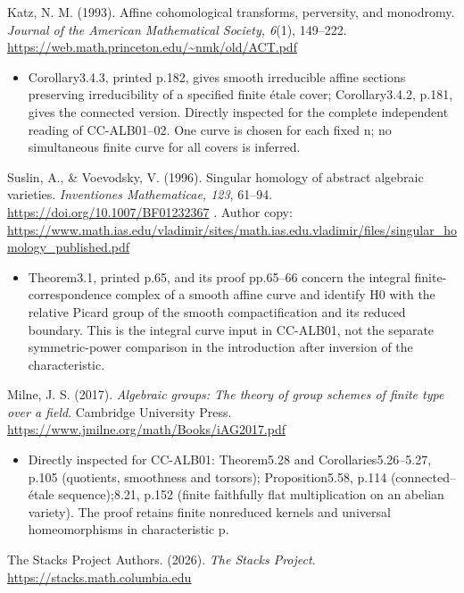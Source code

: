 \documentclass[11pt,a4paper]{article}
\providecommand{\tightlist}{\setlength{\itemsep}{0pt}\setlength{\parskip}{0pt}}
\theoremstyle{definition}\newtheorem{definition}[theorem]{Definition}
\theoremstyle{remark}\newtheorem{remark}[theorem]{Remark}
\begin{document}
Katz, N. M. (1993). Affine cohomological transforms, perversity, and
monodromy. \emph{Journal of the American Mathematical Society, 6}(1),
149--222. \url{https://web.math.princeton.edu/~nmk/old/ACT.pdf}

\begin{itemize}
\tightlist
\item
  Corollary3.4.3, printed p.182, gives smooth irreducible affine
  sections preserving irreducibility of a specified finite étale cover;
  Corollary3.4.2, p.181, gives the connected version. Directly inspected
  for the complete independent reading of CC-ALB01--02. One curve is
  chosen for each fixed n; no simultaneous finite curve for all covers
  is inferred.
\end{itemize}

Suslin, A., \& Voevodsky, V. (1996). Singular homology of abstract
algebraic varieties. \emph{Inventiones Mathematicae, 123}, 61--94.
\url{https://doi.org/10.1007/BF01232367} . Author copy:
\url{https://www.math.ias.edu/vladimir/sites/math.ias.edu.vladimir/files/singular_homology_published.pdf}

\begin{itemize}
\tightlist
\item
  Theorem3.1, printed p.65, and its proof pp.65--66 concern the integral
  finite-correspondence complex of a smooth affine curve and identify H0
  with the relative Picard group of the smooth compactification and its
  reduced boundary. This is the integral curve input in CC-ALB01, not
  the separate symmetric-power comparison in the introduction after
  inversion of the characteristic.
\end{itemize}

Milne, J. S. (2017). \emph{Algebraic groups: The theory of group schemes
of finite type over a field}. Cambridge University Press.
\url{https://www.jmilne.org/math/Books/iAG2017.pdf}

\begin{itemize}
\tightlist
\item
  Directly inspected for CC-ALB01: Theorem5.28 and
  Corollaries5.26--5.27, p.105 (quotients, smoothness and torsors);
  Proposition5.58, p.114 (connected--étale sequence);8.21, p.152 (finite
  faithfully flat multiplication on an abelian variety). The proof
  retains finite nonreduced kernels and universal homeomorphisms in
  characteristic p.
\end{itemize}

The Stacks Project Authors. (2026). \emph{The Stacks Project}.
\url{https://stacks.math.columbia.edu}
\end{document}
